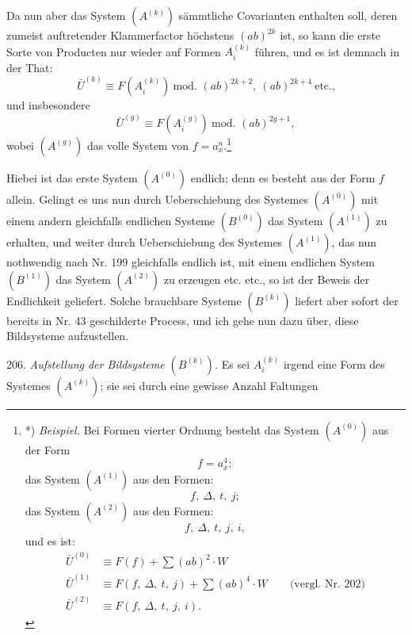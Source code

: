 \documentclass[11pt]{article}
\let\Delta\varDelta
\begin{document}
Da nun aber das System $(A^{(k)})$ sämmtliche Covarianten enthalten
soll, deren zumeist auftretender Klammerfactor höchstens $(ab)^{2k}$
ist, so kann die erste Sorte von Producten nur wieder auf Formen
$A_i^{(k)}$ führen, und es ist demnach in der That:
\[ \bar U^{(k)} \equiv F(A_i^{(k)}) \ \text{mod. } (ab)^{2k+2},\ (ab)^{2k+4}\ \text{etc.,} \]
und insbesondere
\[ \bar U^{(g)} \equiv F(A_i^{(g)}) \ \text{mod. } (ab)^{2g+1}, \]
wobei $(A^{(g)})$ das volle System von $f=a_x^n$.\footnote{*)
\textit{Beispiel.} Bei Formen vierter Ordnung besteht das System
$(A^{(0)})$ aus der Form
\[ f = a_x^4; \]
das System $(A^{(1)})$ aus den Formen:
\[ f,\ \Delta,\ t,\ j; \]
das System $(A^{(2)})$ aus den Formen:
\[ f,\ \Delta,\ t,\ j,\ i, \]
und es ist:
\[
\begin{aligned}
\bar U^{(0)} &\equiv F(f) + \sum (ab)^2\cdot W\\
\bar U^{(1)} &\equiv F(f,\ \Delta,\ t,\ j) + \sum (ab)^4\cdot W \qquad\text{(vergl. Nr. 202)}\\
\bar U^{(2)} &\equiv F(f,\ \Delta,\ t,\ j,\ i).
\end{aligned}
\]}

Hiebei ist das erste System $(A^{(0)})$ endlich; denn es besteht aus der
Form $f$ allein. Gelingt es uns nun durch Ueberschiebung des Systemes
$(A^{(0)})$ mit einem andern gleichfalls endlichen Systeme $(B^{(0)})$
das System $(A^{(1)})$ zu erhalten, und weiter durch Ueberschiebung des
Systemes $(A^{(1)})$, das nun nothwendig nach Nr. 199 gleichfalls
endlich ist, mit einem endlichen System $(B^{(1)})$ das System
$(A^{(2)})$ zu erzeugen etc. etc., so ist der Beweis der Endlichkeit
geliefert. Solche brauchbare Systeme $(B^{(k)})$ liefert aber sofort der
bereits in Nr. 43 geschilderte Process, und ich gehe nun dazu über,
diese Bildsysteme aufzustellen.

206. \textit{Aufstellung der Bildsysteme $(B^{(k)})$.} Es sei $A_i^{(k)}$
irgend eine Form des Systemes $(A^{(k)})$; sie sei durch eine gewisse
Anzahl Faltungen
\end{document}
